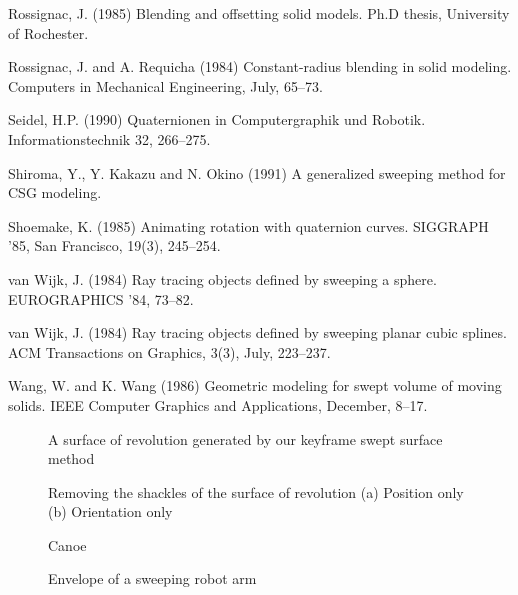 \begin{thebibliography}{Shoemake 85}
Rossignac, J. (1985)
Blending and offsetting solid models.
Ph.D thesis, University of Rochester.

Rossignac, J. and A. Requicha (1984)
Constant-radius blending in solid modeling.
Computers in Mechanical Engineering, July, 65--73.

Seidel, H.P. (1990) Quaternionen in Computergraphik und Robotik.
Informationstechnik 32, 266--275.

Shiroma, Y., Y. Kakazu and N. Okino (1991)
A generalized sweeping method for CSG modeling.

Shoemake, K. (1985) Animating rotation with quaternion curves.
SIGGRAPH '85, San Francisco, 19(3), 245--254.

van Wijk, J. (1984)
Ray tracing objects defined by sweeping a sphere.
EUROGRAPHICS '84, 73--82.

van Wijk, J. (1984)
Ray tracing objects defined by sweeping planar cubic splines.
ACM Transactions on Graphics, 3(3), July, 223--237.

Wang, W. and K. Wang (1986)
Geometric modeling for swept volume of moving solids.
IEEE Computer Graphics and Applications, December, 8--17.

\end{thebibliography}

\begin{figure}
\label{fig:coke}
\vspace{2in}
\caption{A surface of revolution generated by our keyframe swept surface method}
\end{figure}

\begin{figure}
\label{fig:cokewarp}
\vspace{2in}
\caption{Removing the shackles of the surface of revolution
	(a) Position only (b) Orientation only}
\end{figure}

\begin{figure}
\label{fig:canoe}
\vspace{2in}
\caption{Canoe}
\end{figure}

\begin{figure}
\label{fig:robot}
\vspace{2in}
\caption{Envelope of a sweeping robot arm}
\end{figure}

